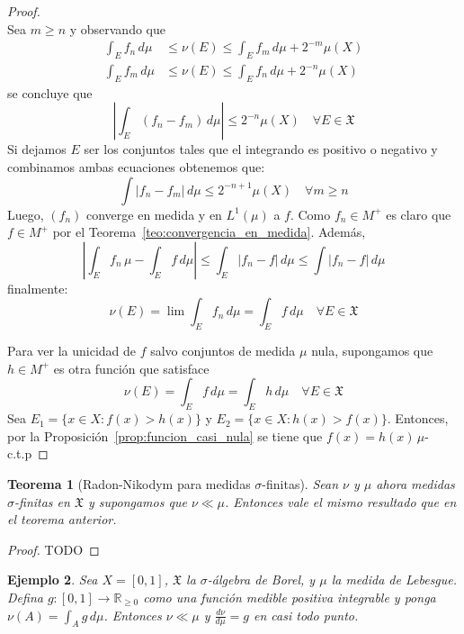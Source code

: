 \documentclass[12pt,a4paper]{article}
\theoremstyle{profesional}
\newtheorem{teorema}{Teorema}[section]
\theoremstyle{definicion-style}
\newtheorem{ejemplo}[teorema]{Ejemplo}
\newcommand{\R}{\mathbb{R}}
\newcommand{\X}{\mathfrak{X}}
\begin{document}
\begin{proof}
\[    \]
    Sea \( m \geq n \) y observando que \begin{align*}
        \int_E f_n \, d \mu & \leq \nu(E) \leq \int_E f_m \, d \mu + 2^{-m} \mu(X) \\
        \int_E f_m \, d \mu & \leq \nu(E) \leq \int_E f_n \, d \mu + 2^{-n} \mu(X)
    \end{align*}
    se concluye que \[
        \left| \int_E (f_n - f_m) \, d \mu \right| \leq 2^{-n} \mu(X) \quad \forall E \in \X
    \]
    Si dejamos \( E \) ser los conjuntos tales que el integrando es positivo o negativo y combinamos ambas ecuaciones obtenemos que:\[
        \int |f_n - f_m| \, d \mu \leq 2^{-n+1} \mu(X) \quad \forall m \geq n
    \]
    Luego, \( (f_n) \) converge en medida y en \( L^1(\mu) \) a \( f \). Como \( f_n \in M^+ \) es claro que \( f \in M^+ \) por el Teorema~\ref{teo:convergencia_en_medida}. Además, \[
        \left | \int_E f_n \, \mu - \int_E f \, d \mu \right| \leq \int_E |f_n - f| \, d \mu \leq \int | f_n - f | \, d \mu
    \]
    finalmente: \[ \nu(E) = \lim \int_E f_n \, d \mu = \int_E f \, d \mu \quad \forall E \in \X \]

    Para ver la unicidad de \( f \) salvo conjuntos de medida \( \mu \) nula, supongamos que \( h \in M^+ \) es otra función que satisface\[
        \nu(E) = \int_E f \, d \mu = \int_E h \, d \mu \quad \forall E \in \X
    \]
    Sea \( E_1 = \{ x \in X : f(x) > h(x) \} \) y \( E_2 = \{ x \in X : h(x) > f(x) \} \). Entonces, por la Proposición~\ref{prop:funcion_casi_nula} se tiene que \( f(x) = h(x) \, \mu \)-c.t.p
\end{proof}

\begin{teorema}[Radon-Nikodym para medidas \(\sigma \)-finitas]
    Sean \( \nu \) y \( \mu \) ahora medidas \( \sigma \)-finitas en \( \X \) y supongamos que \( \nu \ll \mu \).
    Entonces vale el mismo resultado que en el teorema anterior.
\end{teorema}
\begin{proof}
    TODO
\end{proof}

\begin{ejemplo}
    Sea \(X = [0, 1]\), \(\X \) la \(\sigma \)-álgebra de Borel, y \(\mu \) la medida de Lebesgue. Defina \(g: [0, 1] \to \R_{\geq 0}\) como una función medible positiva integrable y ponga \(\nu(A) = \int_A g \, d\mu \). Entonces \(\nu \ll \mu \) y \(\frac{d\nu}{d\mu} = g\) en casi todo punto.
\end{ejemplo}
\end{document}
